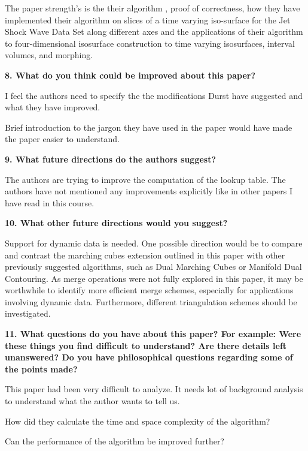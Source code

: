 \documentclass{article}[12pt]
\begin{document}
{
    The paper strength's is the their algorithm , proof of correctness, how they have implemented their algorithm on slices of a time varying iso-surface for the Jet Shock Wave Data Set along different axes and the applications of their algorithm to four-dimensional isosurface construction to time varying isosurfaces, interval volumes, and morphing.

}

\vspace{2ex}\noindent
{\bf 8. What do you think could be improved about this paper? }

{
    I feel the authors need to specify the the modifications Durst have suggested and what they have improved.

    Brief introduction to the jargon they have used in the paper would have made the paper easier to understand.
    
}

\vspace{2ex}\noindent
{\bf 9. What future directions do the authors suggest?}

{
    The authors are trying to improve the computation of the lookup table. The authors have not mentioned any improvements explicitly like in other papers I have read in this course.
}

\vspace{2ex}\noindent
{\bf 10. What other future directions would you suggest? }

{
   Support for dynamic data is needed. One possible direction would be to compare and contrast the marching cubes extension outlined in this paper with other previously suggested algorithms, such as Dual Marching Cubes or Manifold Dual Contouring. 
   As merge operations were not fully explored in this paper, it may be worthwhile to identify more efficient merge schemes, especially for applications involving dynamic data. Furthermore, different triangulation schemes should be investigated. 
}

\vspace{2ex}\noindent
{\bf 11. What questions do you have about this paper? For example: Were these things you find difficult to understand? Are there details left unanswered? Do you have philosophical questions regarding some of the points made?}

{
    This paper had been very difficult to analyze. It needs lot of background analysis to understand what the author wants to tell us.
    
    How did they calculate the time and space complexity of the algorithm?
    
    Can the performance of the algorithm be improved further?
    
    

}
\end{document}
